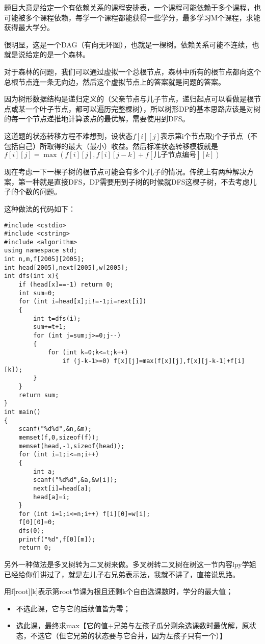 题目大意是给定一个有依赖关系的课程安排表，一个课程可能依赖于多个课程，也可能被多个课程依赖，每学一个课程都能获得一些学分，最多学习M个课程，求能获得最大学分。

很明显，这是一个DAG（有向无环图），也就是一棵树。依赖关系可能不连续，也就是说给定的是一个森林。

对于森林的问题，我们可以通过虚拟一个总根节点，森林中所有的根节点都向这个总根节点连一条无向边，然后这个虚拟节点上的答案就是问题的答案。

因为树形数据结构是递归定义的（父亲节点与儿子节点，递归起点可以看做是根节点或某一个叶子节点，都可以遍历完整棵树），所以树形DP的基本思路应该是对树的每一个节点递推地计算该点的最优解，需要使用到DFS。

这道题的状态转移方程不难想到，设状态$f[i][j]$表示第i个节点取j个子节点（不包括自己）所取得的最大（最小）收益。然后标准状态转移模板就是$f[i][j]=\max(f[i][j],f[i][j-k]+f[儿子节点编号][k])$

现在考虑一下一棵子树的根节点可能会有多个儿子的情况。传统上有两种解决方案，第一种就是直接DFS，DP需要用到子树的时候就DFS这棵子树，不去考虑儿子的个数的问题。

这种做法的代码如下：
\begin{verbatim}
#include <cstdio>
#include <cstring>
#include <algorithm>
using namespace std;
int n,m,f[2005][2005];
int head[2005],next[2005],w[2005];
int dfs(int x){
    if (head[x]==-1) return 0;
    int sum=0;
    for (int i=head[x];i!=-1;i=next[i])
    {
        int t=dfs(i);
        sum+=t+1;
        for (int j=sum;j>=0;j--)
        {
            for (int k=0;k<=t;k++)
                if (j-k-1>=0) f[x][j]=max(f[x][j],f[x][j-k-1]+f[i][k]);
        }
    }
    return sum;
}
int main()
{
    scanf("%d%d",&n,&m);
    memset(f,0,sizeof(f));
    memset(head,-1,sizeof(head));
    for (int i=1;i<=n;i++)
    {
        int a;
        scanf("%d%d",&a,&w[i]);
        next[i]=head[a];
        head[a]=i;
    }
    for (int i=1;i<=n;i++) f[i][0]=w[i];
    f[0][0]=0;
    dfs(0);
    printf("%d",f[0][m]);
    return 0;
\end{verbatim}

另外一种做法是多叉树转为二叉树来做。多叉树转二叉树在树这一节内容lpy学姐已经给你们讲过了，就是左儿子右兄弟表示法，我就不讲了，直接说思路。

用f[root][k]表示第root节课为根且还剩k个自由选课数时，学分的最大值；
\begin{itemize}
	\item{不选此课，它与它的后续值皆为零；}
	\item{选此课，最终求max【它的值+兄弟与左孩子瓜分剩余选课数时最优解，原状态，不选它（但它兄弟的状态要与它合并，因为左孩子只有一个）】}
\end{itemize}

